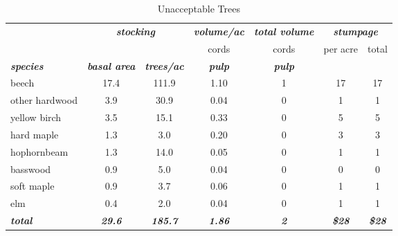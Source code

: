 \documentclass[landscape]{article}
\begin{document}
\begin{table}[H]

\caption{\label{tab:unnamed-chunk-50}Unacceptable Trees}
\fontsize{10}{12}\selectfont
\begin{tabular}[t]{lcccccc}
\toprule
\multicolumn{1}{c}{\em{\textbf{ }}} & \multicolumn{2}{c}{\em{\textbf{stocking}}} & \multicolumn{1}{c}{\em{\textbf{volume/ac }}} & \multicolumn{1}{c}{\em{\textbf{total volume}}} & \multicolumn{2}{c}{\em{\textbf{stumpage}}} \\
\cmidrule(l{3pt}r{3pt}){2-3} \cmidrule(l{3pt}r{3pt}){4-4} \cmidrule(l{3pt}r{3pt}){5-5} \cmidrule(l{3pt}r{3pt}){6-7}
\multicolumn{3}{c}{ } & \multicolumn{1}{c}{cords} & \multicolumn{1}{c}{cords} & \multicolumn{1}{c}{per acre} & \multicolumn{1}{c}{total} \\
\cmidrule(l{3pt}r{3pt}){4-4} \cmidrule(l{3pt}r{3pt}){5-5} \cmidrule(l{3pt}r{3pt}){6-6} \cmidrule(l{3pt}r{3pt}){7-7}
\rowcolor[HTML]{DCDCDC}  \em{\textbf{species}} & \em{\textbf{basal area}} & \em{\textbf{trees/ac}} & \em{\textbf{pulp}} & \em{\textbf{pulp}} & \em{\textbf{ }} & \em{\textbf{ }}\\
\midrule
\rowcolor{gray!6}  beech & 17.4 & 111.9 & 1.10 & 1 & 17 & 17\\
 
other hardwood & 3.9 & 30.9 & 0.04 & 0 & 1 & 1\\
 
\rowcolor{gray!6}  yellow birch & 3.5 & 15.1 & 0.33 & 0 & 5 & 5\\
 
hard maple & 1.3 & 3.0 & 0.20 & 0 & 3 & 3\\
 
\rowcolor{gray!6}  hophornbeam & 1.3 & 14.0 & 0.05 & 0 & 1 & 1\\
 
basswood & 0.9 & 5.0 & 0.04 & 0 & 0 & 0\\
 
\rowcolor{gray!6}  soft maple & 0.9 & 3.7 & 0.06 & 0 & 1 & 1\\
 
elm & 0.4 & 2.0 & 0.04 & 0 & 1 & 1\\
 
\rowcolor{gray!6}  \rowcolor[HTML]{DCDCDC}  \em{\textbf{total}} & \em{\textbf{29.6}} & \em{\textbf{185.7}} & \em{\textbf{1.86}} & \em{\textbf{2}} & \em{\textbf{\$28}} & \em{\textbf{\$28}}\\
\bottomrule
\end{tabular}
\end{table}
\end{document}
